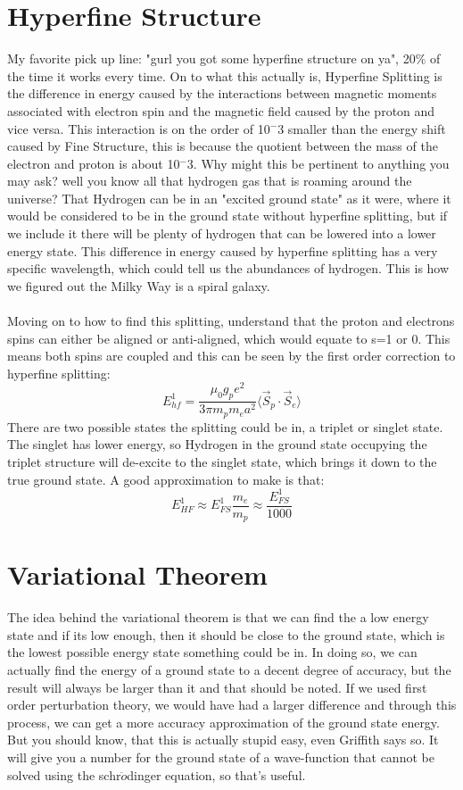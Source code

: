 \documentclass[garamond]{article}
\begin{document}
\section{Hyperfine Structure}
My favorite pick up line: "gurl you got some hyperfine structure on ya", 20$\%$ of the time it works every time. On to what this actually is, Hyperfine Splitting is the difference in energy caused by the interactions between magnetic moments associated with electron spin and the magnetic field caused by the proton and vice versa. This interaction is on the order of 10$^-3$ smaller than the energy shift caused by Fine Structure, this is because the quotient between the mass of the electron and proton is about 10$^-3$. Why might this be pertinent to anything you may ask? well you know all that hydrogen gas that is roaming around the universe? That Hydrogen can be in an "excited ground state" as it were, where it would be considered to be in the ground state without hyperfine splitting, but if we include it there will be plenty of hydrogen that can be lowered into a lower energy state. This difference in energy caused by hyperfine splitting has a very specific wavelength, which could tell us the abundances of hydrogen. This is how we figured out the Milky Way is a spiral galaxy.\\
\\
Moving on to how to find this splitting, understand that the proton and electrons spins can either be aligned or anti-aligned, which would equate to s=1 or 0. This means both spins are coupled and this can be seen by the first order correction to hyperfine splitting:
\begin{equation}
E_{hf}^1=\frac{\mu_0g_pe^2}{3\pi m_pm_ea^2}\langle \vec{S}_p\cdot\vec{S}_e\rangle
\end{equation}
There are two possible states the splitting could be in, a triplet or singlet state. The singlet has lower energy, so Hydrogen in the ground state occupying the triplet structure will de-excite to the singlet state, which brings it down to the true ground state. A good approximation to make is that:
\begin{equation}
E_{HF}^1\approx E_{FS}^1\frac{m_e}{m_p}\approx\frac{E_{FS}^1}{1000}
\end{equation}

\section{Variational Theorem}
The idea behind the variational theorem is that we can find the a low energy state and if its low enough, then it should be close to the ground state, which is the lowest possible energy state something could be in. In doing so, we can actually find the energy of a ground state to a decent degree of accuracy, but the result will always be larger than it and that should be noted. If we used first order perturbation theory, we would have had a larger difference and through this process, we can get a more accuracy approximation of the ground state energy. But you should know, that this is actually stupid easy, even Griffith says so. It will give you a number for the ground state of a wave-function that cannot be solved using the schr$\ddot{o}$dinger equation, so that's useful.
\end{document}
